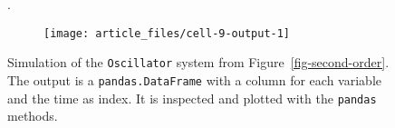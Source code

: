 \begin{figure}[t]
\begin{minipage}[t]{0.45\linewidth}
{}

\end{minipage}%
\hfill
\begin{minipage}[t]{0.45\linewidth}

{\centering 

\begin{CodeInput}
\begin{Highlighting}[]
.\KeywordTok{()}\OperatorTok{;}
\end{Highlighting}
\end{CodeInput}

\begin{CodeOutput}
    \begin{figure}[H]
        \texttt{[image: article\_files/cell-9-output-1]}
    \end{figure}
\end{CodeOutput}

}

\end{minipage}%

\caption{\label{fig-sim}Simulation of the \texttt{Oscillator} system
from Figure~\ref{fig-second-order}. The output is a
\texttt{pandas.DataFrame} with a column for each variable and the time
as index. It is inspected and plotted with the \texttt{pandas} methods.}

\end{figure}
